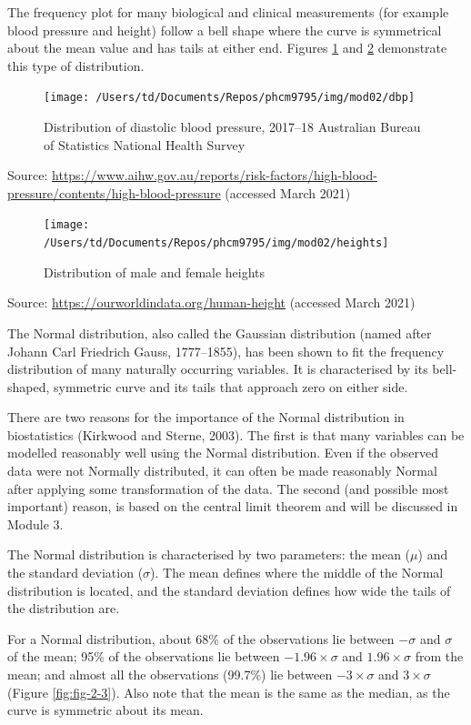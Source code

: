 \documentclass[
]{memoir}
\begin{document}
The frequency plot for many biological and clinical measurements (for example blood pressure and height) follow a bell shape where the curve is symmetrical about the mean value and has tails at either end. Figures \ref{fig:fig-2-1} and \ref{fig:fig-2-2} demonstrate this type of distribution.

\begin{figure}
\texttt{[image: /Users/td/Documents/Repos/phcm9795/img/mod02/dbp]} \caption{Distribution of diastolic blood pressure, 2017–18 Australian Bureau of Statistics National Health Survey}\label{fig:fig-2-1}
\end{figure}

Source: \url{https://www.aihw.gov.au/reports/risk-factors/high-blood-pressure/contents/high-blood-pressure} (accessed March 2021)

\begin{figure}
\texttt{[image: /Users/td/Documents/Repos/phcm9795/img/mod02/heights]} \caption{Distribution of male and female heights}\label{fig:fig-2-2}
\end{figure}

Source: \url{https://ourworldindata.org/human-height} (accessed March 2021)

The Normal distribution, also called the Gaussian distribution (named after Johann Carl Friedrich Gauss, 1777--1855), has been shown to fit the frequency distribution of many naturally occurring variables. It is characterised by its bell-shaped, symmetric curve and its tails that approach zero on either side.

There are two reasons for the importance of the Normal distribution in biostatistics (Kirkwood and Sterne, 2003). The first is that many variables can be modelled reasonably well using the Normal distribution. Even if the observed data were not Normally distributed, it can often be made reasonably Normal after applying some transformation of the data. The second (and possible most important) reason, is based on the central limit theorem and will be discussed in Module 3.

The Normal distribution is characterised by two parameters: the mean (\(\mu\)) and the standard deviation (\(\sigma\)). The mean defines where the middle of the Normal distribution is located, and the standard deviation defines how wide the tails of the distribution are.

For a Normal distribution, about 68\% of the observations lie between \(- \sigma\) and \(\sigma\) of the mean; 95\% of the observations lie between \(−1.96 \times \sigma\) and \(1.96 \times \sigma\) from the mean; and almost all the observations (99.7\%) lie between \(-3 \times \sigma\) and \(3 \times \sigma\) (Figure \ref{fig:fig-2-3}). Also note that the mean is the same as the median, as the curve is symmetric about its mean.
\end{document}
